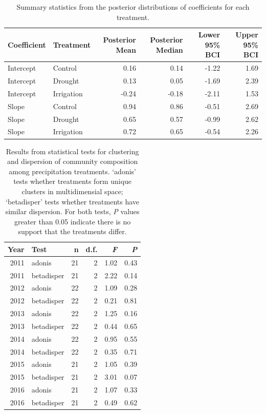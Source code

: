 \documentclass[fleqn,10pt,lineno]{wlpeerj} %
\begin{document}
\begin{table}[ht]
\centering
\caption{Summary statistics from the posterior distributions of coefficients for each treatment.} 
\begingroup\normalsize
\begin{tabular}{llrrrr}
  \hline
Coefficient & Treatment & Posterior Mean & Posterior Median & Lower 95\% BCI & Upper 95\% BCI \\ 
  \hline
Intercept & Control & 0.16 & 0.14 & -1.22 & 1.69 \\ 
  Intercept & Drought & 0.13 & 0.05 & -1.69 & 2.39 \\ 
  Intercept & Irrigation & -0.24 & -0.18 & -2.11 & 1.53 \\ 
  Slope & Control & 0.94 & 0.86 & -0.51 & 2.69 \\ 
  Slope & Drought & 0.65 & 0.57 & -0.99 & 2.62 \\ 
  Slope & Irrigation & 0.72 & 0.65 & -0.54 & 2.26 \\ 
   \hline
\end{tabular}
\endgroup
\end{table}\begin{table}[ht]
\centering
\caption{Results from statistical tests for clustering and dispersion of community composition among precipitation treatments. `adonis' tests whether treatments form unique clusters in multidimensial space; `betadisper' tests whether treatments have similar dispersion. For both tests, \emph{P} values greater than 0.05 indicate there is no support that the treatments differ.} 
\begingroup\normalsize
\begin{tabular}{rlrrrr}
  \hline
Year & Test & n & d.f. & \emph{F} & \emph{P} \\ 
  \hline
2011 & adonis &  21 &   2 & 1.02 & 0.43 \\ 
  2011 & betadisper &  21 &   2 & 2.22 & 0.14 \\ 
  2012 & adonis &  22 &   2 & 1.09 & 0.28 \\ 
  2012 & betadisper &  22 &   2 & 0.21 & 0.81 \\ 
  2013 & adonis &  22 &   2 & 1.25 & 0.16 \\ 
  2013 & betadisper &  22 &   2 & 0.44 & 0.65 \\ 
  2014 & adonis &  22 &   2 & 0.95 & 0.55 \\ 
  2014 & betadisper &  22 &   2 & 0.35 & 0.71 \\ 
  2015 & adonis &  21 &   2 & 1.05 & 0.39 \\ 
  2015 & betadisper &  21 &   2 & 3.01 & 0.07 \\ 
  2016 & adonis &  21 &   2 & 1.07 & 0.33 \\ 
  2016 & betadisper &  21 &   2 & 0.49 & 0.62 \\ 
   \hline
\end{tabular}
\endgroup
\end{table}
\end{document}
